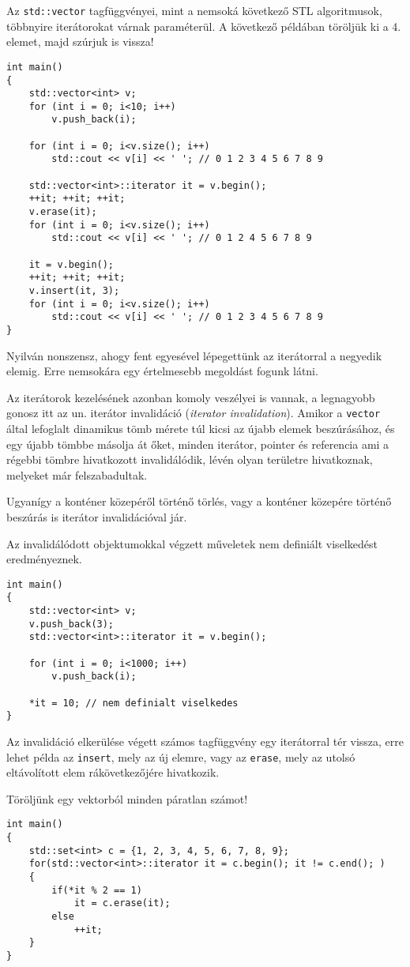\documentclass[a4paper,11.5pt]{article}
\begin{document}
	\medskip
	Az \texttt{std::vector} tagfüggvényei, mint a nemsoká következő STL algoritmusok, többnyire iterátorokat várnak paraméterül. A következő példában töröljük ki a 4. elemet, majd szúrjuk is vissza!
	\begin{lstlisting}
int main()
{
	std::vector<int> v;
	for (int i = 0; i<10; i++)
		v.push_back(i);
		
	for (int i = 0; i<v.size(); i++)
		std::cout << v[i] << ' '; // 0 1 2 3 4 5 6 7 8 9
		
	std::vector<int>::iterator it = v.begin();
	++it; ++it; ++it;
	v.erase(it);
	for (int i = 0; i<v.size(); i++)
		std::cout << v[i] << ' '; // 0 1 2 4 5 6 7 8 9
	
	it = v.begin();
	++it; ++it; ++it; 
	v.insert(it, 3);
	for (int i = 0; i<v.size(); i++)
		std::cout << v[i] << ' '; // 0 1 2 3 4 5 6 7 8 9
}
	\end{lstlisting}
	\begin{note}
		Nyilván nonszensz, ahogy fent egyesével lépegettünk az iterátorral a negyedik elemig. Erre nemsokára egy értelmesebb megoldást fogunk látni.
	\end{note}
	Az iterátorok kezelésének azonban komoly veszélyei is vannak, a legnagyobb gonosz itt az un. iterátor invalidáció (\textit{iterator invalidation}). Amikor a \texttt{vector} által lefoglalt dinamikus tömb mérete túl kicsi az újabb elemek beszúrásához, és egy újabb tömbbe másolja át őket, minden iterátor, pointer és referencia ami a régebbi tömbre hivatkozott invalidálódik, lévén olyan területre hivatkoznak, melyeket már felszabadultak. 
	\smallskip
	
	Ugyanígy a konténer közepéről történő törlés, vagy a konténer közepére történő beszúrás is iterátor invalidációval jár.
	\smallskip
	
	Az invalidálódott objektumokkal végzett műveletek nem definiált viselkedést eredményeznek.
	\begin{lstlisting}
int main()
{
	std::vector<int> v;
	v.push_back(3);
	std::vector<int>::iterator it = v.begin();
	
	for (int i = 0; i<1000; i++)
		v.push_back(i);
		
	*it = 10; // nem definialt viselkedes
}
	\end{lstlisting}
	Az invalidáció elkerülése végett számos tagfüggvény egy iterátorral tér vissza, erre lehet példa az \texttt{insert}, mely az új elemre, vagy az \texttt{erase}, mely az utolsó eltávolított elem rákövetkezőjére hivatkozik.
	
	\smallskip
	Töröljünk egy vektorból minden páratlan számot!
	\begin{lstlisting}
int main()
{
	std::set<int> c = {1, 2, 3, 4, 5, 6, 7, 8, 9};
	for(std::vector<int>::iterator it = c.begin(); it != c.end(); )
	{
		if(*it % 2 == 1)
			it = c.erase(it);
		else
			++it;
	}
}
	\end{lstlisting}
	
\end{document}
